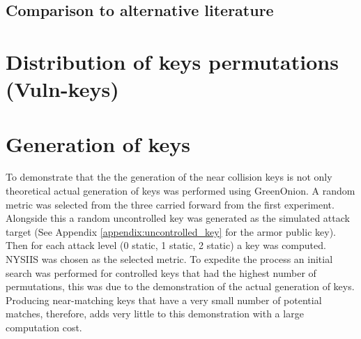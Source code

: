 \subsection{Comparison to alternative literature}













\section{Distribution of keys permutations (Vuln-keys)}

\newpage 

\section{Generation of keys}
To demonstrate that the the generation of the near collision keys is not only theoretical actual generation of keys was performed using GreenOnion. A random metric was selected from the three carried forward from the first experiment. Alongside this a random uncontrolled key was generated as the simulated attack target (See Appendix \ref{appendix:uncontrolled_key} for the armor public key). Then for each attack level (0 static, 1 static, 2 static) a key was computed. NYSIIS was chosen as the selected metric. To expedite the process an initial search was performed for controlled keys that had the highest number of permutations, this was due to the demonstration of the actual generation of keys. Producing near-matching keys that have a very small number of potential matches, therefore, adds very little to this demonstration with a large computation cost.


